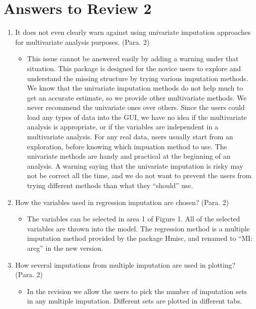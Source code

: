 \documentclass[12pt,english]{article}
\begin{document}
\section*{Answers to Review 2}
\begin{enumerate}

\item It does not even clearly warn against using univariate imputation
approaches for multivariate analysis purposes. (Para. 2)
\begin{itemize}
\item This issue cannot be answered easily by adding a warning under that
situation. This package is designed for the novice users to explore
and understand the missing structure by trying various imputation
methods. We know that the univariate imputation methods do not help
much to get an accurate estimate, so we provide other multivariate
methods. We never recommend the univariate ones over others. Since
the users could load any types of data into the GUI, we have no idea
if the multivariate analysis is appropriate, or if the variables are
independent in a multivariate analysis. For any real data, users usually
start from an exploration, before knowing which impuation method to
use. The univariate methods are handy and practical at the beginning
of an analysis. A warning saying that the univariate imputation is
risky may not be correct all the time, and we do not want to prevent
the users from trying different methods than what they ``should''
use.
\end{itemize}

\item How the variables used in regression imputation are chosen? (Para.
2)
\begin{itemize}
\item The variables can be selected in area 1 of Figure 1. All of the selected
variables are thrown into the model. The regression method is a multiple
imputation method provided by the package Hmisc, and renamed to ``MI:
areg'' in the new version.
\end{itemize}

\item How several imputations from multiple imputation are used in plotting?
(Para. 2)
\begin{itemize}
\item In the revision we allow the users to pick the number of imputation
sets in any multiple imputation. Different sets are plotted in different
tabs.
\end{itemize}


\end{enumerate}
\end{document}
